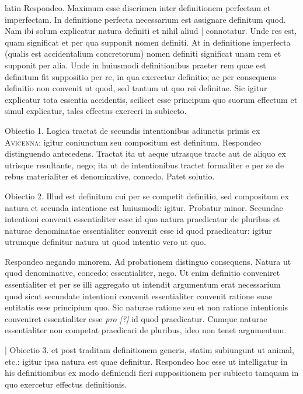 \begin{otherlanguage*}{latin}
\pstart
  Respondeo. Maximum esse discrimen inter definitionem perfectam et imperfectam. In definitione perfecta necessarium est assignare definitum quod. Nam ibi solum explicatur natura definiti et nihil aliud \textnormal{|}   connotatur. Unde res est, quam significat et per qua supponit nomen definiti. At in definitione imperfecta (qualis est accidentalium concretorum) nomen definiti significat unam rem et supponit per alia. Unde in huiusmodi definitionibus praeter rem quae est definitum fit suppositio per re, in qua exercetur definitio; ac per consequens definitio non convenit ut quod, sed tantum ut quo rei definitae. Sic igitur explicatur tota essentia accidentis, scilicet esse principum quo suorum effectum et simul explicatur, tales effectus exerceri in subiecto. 
\pend

\pstart
  Obiectio 1. Logica tractat de secundis intentionibus adiunctis primis ex \textsc{Avicenna}: igitur coniunctum seu compositum est definitum. Respondeo distinguendo antecedens. Tractat ita ut aeque utrasque tracte aut de aliquo ex utrisque resultante, nego; ita ut de intentionibus tractet formaliter e per se de rebus materialiter et denominative, concedo. Patet solutio. 
\pend

\pstart
  Obiectio 2. Illud est definitum cui per se competit definitio, sed compositum ex natura et secunda intentione est huiusmodi: igitur. Probatur minor. Secundae intentioni convenit essentialiter esse id quo natura praedicatur de pluribus et naturae denominatae essentialiter convenit esse id quod praedicatur: igitur utrumque definitur natura ut quod intentio vero ut quo. 
\pend

\pstart
  Respondeo negando minorem. Ad probationem distinguo consequens. Natura ut quod denominative, concedo; essentialiter, nego. Ut enim definitio conveniret essentialiter et per se illi aggregato ut intendit argumentum erat necessarium quod sicut secundate intentioni convenit essentialiter convenit ratione suae entitatis esse principium quo. Sic naturae ratione seu et non ratione intentionis conveniret essentialiter esse \emph{pro [?]} id quod praedicatur. Cumque naturae essentialiter non competat praedicari de pluribus, ideo non tenet argumentum. 
\pend

\pstart
  \textnormal{|} Obiectio 3.  et  post traditam definitionem generis, statim subiungunt ut animal, etc.: igitur ipsa natura est quae definitur. Respondeo hoc esse ut intelligatur in his definitionibus ex modo definiendi fieri suppositionem per subiecto tamquam in quo exercetur effectus definitionis. 
\pend


\end{otherlanguage*}
